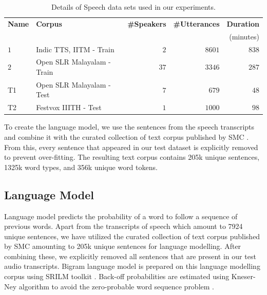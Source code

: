 \begin{table}[htpb]
	\caption{Details of Speech data sets used in our experiments. }
	\label{tab:speechdatasets}
	\centering
	\begin{tabular}{llrrr}
		\hline \hline
		\textbf{Name} & \textbf{Corpus}                                     & \textbf{\#Speakers} & \textbf{\#Utterances} & \textbf{Duration} \\
		              &                                                     &                     &                       & (minutes)         \\
		\hline
		$1$             & Indic TTS, IITM \cite{baby2016resources}- Train     & $2$                   & $8601$                  & $838$               \\
		$2$             & Open SLR Malayalam \cite{he-etal-2020-open} - Train & $37$                  & $3346$                  & $287$               \\
		T1            & Open SLR Malayalam \cite{he-etal-2020-open} - Test  & $7$                   & $679$                   & $48$                \\
		T2            & Festvox IIITH \cite{prahallad2012iiit} - Test       & $1$                   & $1000$                  & $98$                \\

\hline
	\end{tabular}

\end{table}

To create the language model, we use the sentences from the speech transcripts
and combine it with the curated collection of text corpus published by SMC
\cite{smctext}. From this, every sentence that appeared in our test dataset is
explicitly removed to prevent over-fitting. The resulting text corpus contains
205k unique sentences, 1325k word types, and 356k unique word tokens.

\subsection{Language Model}

Language model predicts the probability of a word to follow a sequence of
previous words. Apart from the transcripts of speech which amount to 7924
unique sentences, we have utilized the curated collection of text corpus
published by SMC \cite{smctext} amounting to 205k unique sentences for language modelling. After combining these, we explicitly removed all sentences that are present in our test audio transcripts. Bigram language model is prepared on this language modelling corpus using SRILM toolkit \cite{stolcke2002srilm}. Back-off probabilities are estimated using
Kneser-Ney algorithm to avoid the zero-probable word sequence problem
\cite{Kneysmoothing1995}.

